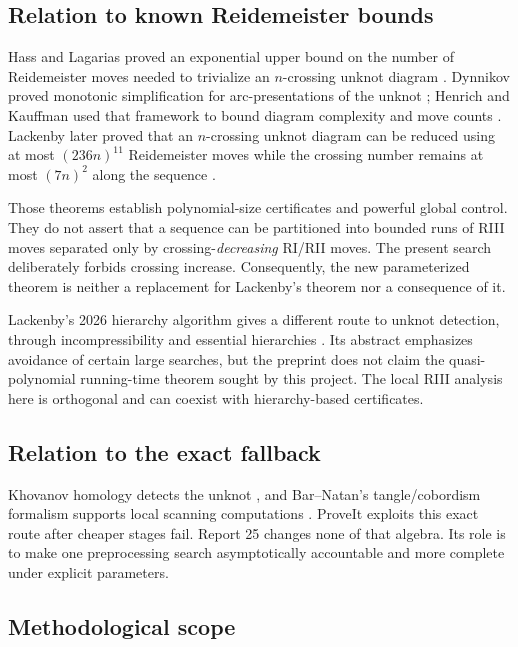 \subsection{Relation to known Reidemeister bounds}

Hass and Lagarias proved an exponential upper bound on the number of
Reidemeister moves needed to trivialize an $n$-crossing unknot diagram
\cite{HassLagarias2001}.  Dynnikov proved monotonic simplification for
arc-presentations of the unknot \cite{Dynnikov2006}; Henrich and Kauffman used
that framework to bound diagram complexity and move counts
\cite{HenrichKauffman2011}.  Lackenby later proved that an $n$-crossing unknot
diagram can be reduced using at most $(236n)^{11}$ Reidemeister moves while the
crossing number remains at most $(7n)^2$ along the sequence
\cite{Lackenby2015}.

Those theorems establish polynomial-size certificates and powerful global
control.  They do not assert that a sequence can be partitioned into bounded
runs of RIII moves separated only by crossing-\emph{decreasing} RI/RII moves.
The present search deliberately forbids crossing increase.  Consequently, the
new parameterized theorem is neither a replacement for Lackenby's theorem nor a
consequence of it.

Lackenby's 2026 hierarchy algorithm gives a different route to unknot detection,
through incompressibility and essential hierarchies \cite{Lackenby2026}.  Its
abstract emphasizes avoidance of certain large searches, but the preprint does
not claim the quasi-polynomial running-time theorem sought by this project.  The
local RIII analysis here is orthogonal and can coexist with hierarchy-based
certificates.

\subsection{Relation to the exact fallback}

Khovanov homology detects the unknot \cite{KronheimerMrowka2011}, and Bar--Natan's
tangle/cobordism formalism supports local scanning computations
\cite{BarNatan2005}.  ProveIt exploits this exact route after cheaper stages
fail.  Report 25 changes none of that algebra.  Its role is to make one
preprocessing search asymptotically accountable and more complete under explicit
parameters.

\subsection{Methodological scope}

